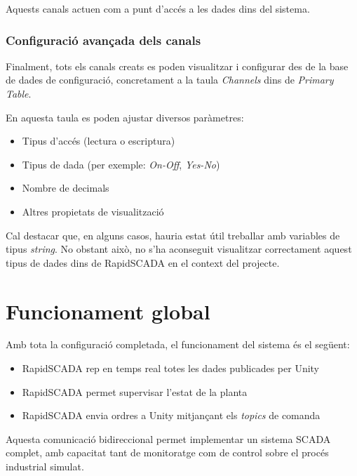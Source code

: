 \documentclass[12pt,a4paper]{report}
\begin{document}
Aquests canals actuen com a punt d'accés a les dades dins del sistema.

\subsubsection{Configuració avançada dels canals}

Finalment, tots els canals creats es poden visualitzar i configurar des de la base de dades de configuració, concretament a la taula \textit{Channels} dins de \textit{Primary Table}.

En aquesta taula es poden ajustar diversos paràmetres:

\begin{itemize}
    \item Tipus d'accés (lectura o escriptura)
    \item Tipus de dada (per exemple: \textit{On-Off}, \textit{Yes-No})
    \item Nombre de decimals
    \item Altres propietats de visualització
\end{itemize}

Cal destacar que, en alguns casos, hauria estat útil treballar amb variables de tipus \textit{string}. No obstant això, no s'ha aconseguit visualitzar correctament aquest tipus de dades dins de RapidSCADA en el context del projecte.

\section{Funcionament global}

Amb tota la configuració completada, el funcionament del sistema és el següent:

\begin{itemize}
    \item RapidSCADA rep en temps real totes les dades publicades per Unity
    \item RapidSCADA permet supervisar l'estat de la planta
    \item RapidSCADA envia ordres a Unity mitjançant els \textit{topics} de comanda
\end{itemize}

Aquesta comunicació bidireccional permet implementar un sistema SCADA complet, amb capacitat tant de monitoratge com de control sobre el procés industrial simulat.
\end{document}
